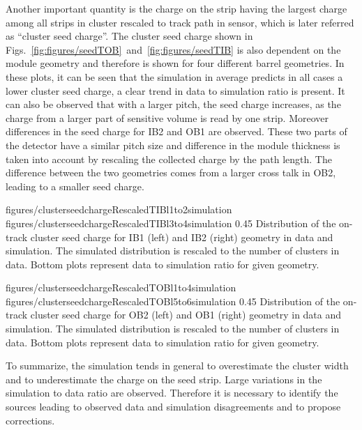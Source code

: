 Another important quantity is the charge on the strip having the largest charge among all strips in cluster rescaled to track path in sensor, which is later referred as ``cluster seed charge''. The cluster seed charge shown in Figs.~\ref{fig:figures/seedTOB}~and~\ref{fig:figures/seedTIB} is also dependent on the module geometry and therefore is shown for four different barrel geometries. In these plots, it can be seen that the simulation in average predicts in all cases a lower cluster seed charge, a clear trend in data to simulation ratio is present. It can also be observed that with a larger pitch, the seed charge increases, as the charge from a larger part of sensitive volume is read by one strip. Moreover differences in the seed charge for IB2 and OB1 are observed. These two parts of the detector have a similar pitch size and difference in the module thickness is taken into account by rescaling the collected charge by the path length. The difference between the two geometries comes from a larger cross talk in OB2, leading to a smaller seed charge.


                 {figures/clusterseedchargeRescaledTIBl1to2simulation}
                 {figures/clusterseedchargeRescaledTIBl3to4simulation} %
                 {0.45}       %
                 { Distribution of the on-track cluster seed charge for IB1 (left) and IB2 (right) geometry in data and simulation. The simulated distribution is rescaled to the number of clusters in data. Bottom plots represent data to simulation ratio for given geometry. }

                 {figures/clusterseedchargeRescaledTOBl1to4simulation}
                 {figures/clusterseedchargeRescaledTOBl5to6simulation} %
                 {0.45}       %
                 { Distribution of the on-track cluster seed charge for OB2 (left) and OB1 (right) geometry in data and simulation. The simulated distribution is rescaled to the number of clusters in data. Bottom plots represent data to simulation ratio for given geometry. }


To summarize, the simulation tends in general to overestimate the cluster width and to underestimate the charge on the seed strip. Large variations in the simulation to data ratio are observed. Therefore it is necessary to identify the sources leading to observed data and simulation disagreements and to propose corrections.


